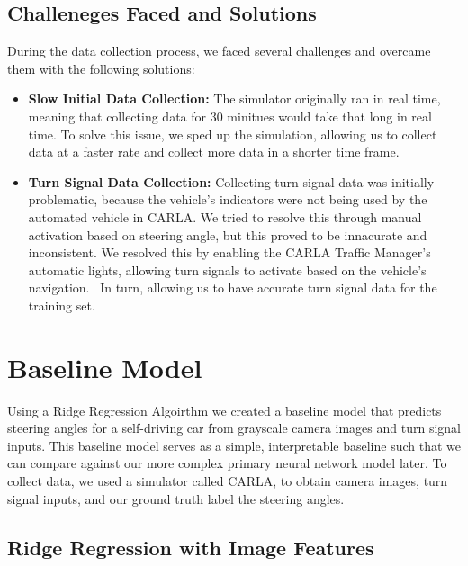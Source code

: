 \documentclass{article} %
\begin{document}
\subsection{Challeneges Faced and Solutions}

During the data collection process, we faced several challenges and overcame them with the following solutions:

\begin{itemize}
  \item \textbf{Slow Initial Data Collection:} The simulator originally ran in real time, meaning that collecting data for 30 minitues would take that long in real time. 
  To solve this issue, we sped up the simulation, allowing us to collect data at a faster rate and collect more data in a shorter time frame.

  \item \textbf{Turn Signal Data Collection:} Collecting turn signal data was initially problematic, 
  because the vehicle's indicators were not being used by the automated vehicle in CARLA. 
  We tried to resolve this through manual activation based on steering angle, but this proved to be innacurate and inconsistent. 
  We resolved this by enabling the CARLA Traffic Manager’s automatic lights, allowing turn signals to activate based on the vehicle's navigation. \
  In turn, allowing us to have accurate turn signal data for the training set. 

\end{itemize}
 
\section{Baseline Model}

Using a Ridge Regression Algoirthm we created a baseline model that predicts steering angles for a self-driving car 
from grayscale camera images and turn signal inputs. This baseline model serves as a simple, interpretable baseline
such that we can compare against our more complex primary neural network model later. To collect data, we used a simulator
called CARLA, to obtain camera images, turn signal inputs, and our ground truth label the steering angles.


\subsection{Ridge Regression with Image Features}
\end{document}
